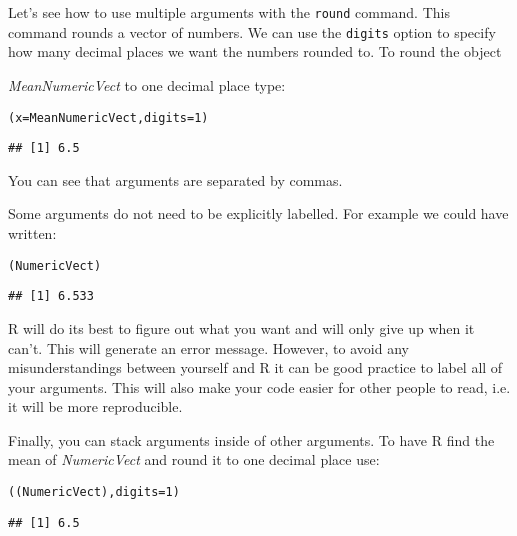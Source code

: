 Let's see how to use multiple arguments with the \texttt{round} command. This command rounds a vector of numbers. We can use the \texttt{digits} option to specify how many decimal places we want the numbers rounded to. To round the object {\emph{MeanNumericVect} to one decimal place type:

\begin{knitrout}
\color{fgcolor}\begin{kframe}
\begin{alltt}
(x = MeanNumericVect, digits = 1)
\end{alltt}
\begin{verbatim}
## [1] 6.5
\end{verbatim}
\end{kframe}
\end{knitrout}


\noindent You can see that arguments are separated by commas. 

Some arguments do not need to be explicitly labelled. For example we could have written:

\begin{knitrout}
\color{fgcolor}\begin{kframe}
\begin{alltt}
(NumericVect)
\end{alltt}
\begin{verbatim}
## [1] 6.533
\end{verbatim}
\end{kframe}
\end{knitrout}


\noindent R will do its best to figure out what you want and will only give up when it can't. This will generate an error message. However, to avoid any misunderstandings between yourself and R it can be good practice to label all of your arguments. This will also make your code easier for other people to read, i.e. it will be more reproducible.

Finally, you can stack arguments inside of other arguments. To have R find the mean of {\emph{NumericVect}} and round it to one decimal place use:

\begin{knitrout}
\color{fgcolor}\begin{kframe}
\begin{alltt}
((NumericVect), digits = 1)
\end{alltt}
\begin{verbatim}
## [1] 6.5
\end{verbatim}
\end{kframe}
\end{knitrout}


}
